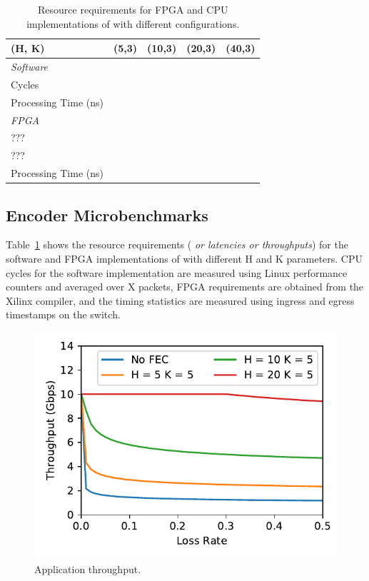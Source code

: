 \begin{table}
\begin{center}
\small
\begin{tabular}{ l l l l l } 
\toprule
(H, K) & (5,3) & (10,3) & (20,3) & (40,3) \\
\midrule
\emph{Software} & & & & \\
\cmidrule{1-1}
Cycles & & & & \\
Processing Time (ns) & & & & \\
\midrule
\emph{FPGA} & & & & \\
\cmidrule{1-1}
??? & & & & \\
??? & & & & \\
Processing Time (ns) & & & & \\
\bottomrule

\end{tabular}
\caption{Resource requirements for FPGA and CPU implementations of \OurSys with different configurations.}
\label{tab:microbenchmarks}
\end{center}
\end{table}

\subsection{Encoder Microbenchmarks}
Table~\ref{tab:microbenchmarks} shows the resource requirements (\emph{
or latencies or throughputs}) for the software and  FPGA implementations of
\OurSys with different H and K parameters. CPU cycles for the software
implementation are measured using Linux performance counters and averaged over
X packets, FPGA requirements are obtained from the Xilinx compiler, and the
timing statistics are measured using ingress and egress timestamps on the
switch.

\begin{figure}
  \centering
  \includegraphics[width=0.3\paperwidth]{fake_tput.pdf}
  \caption{\label{fig:app_tput} Application throughput.}
\end{figure}

